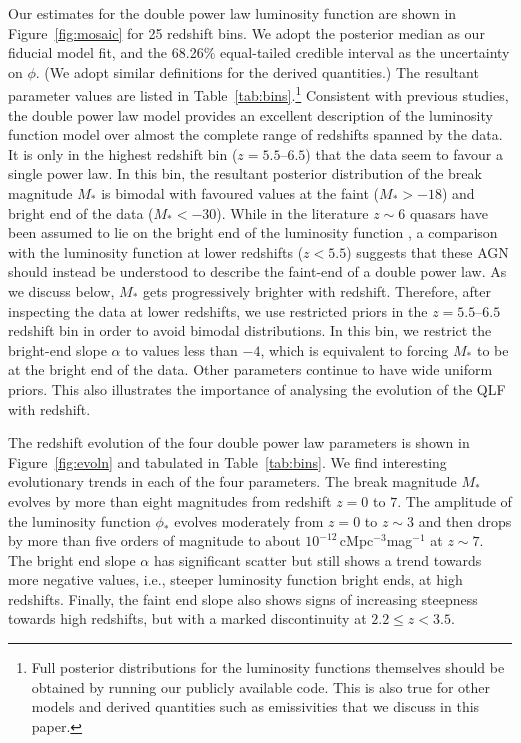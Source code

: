\documentclass[fleqn,usenatbib]{mnras}
\begin{document}
Our estimates for the double power law luminosity function are shown
in Figure~\ref{fig:mosaic} for 25 redshift bins.  We adopt the
posterior median as our fiducial model fit, and the 68.26\%
equal-tailed credible interval as the uncertainty on $\phi$.  (We
adopt similar definitions for the derived quantities.)  The resultant
parameter values are listed in Table~\ref{tab:bins}.\footnote{Full
  posterior distributions for the luminosity functions themselves
  should be obtained by running our publicly available code.  This is
  also true for other models and derived quantities such as
  emissivities that we discuss in this paper.} Consistent with
previous studies, the double power law model provides an excellent
description of the luminosity function model over almost the complete
range of redshifts spanned by the data.  It is only in the highest
redshift bin ($z=5.5$--$6.5$) that the data seem to favour a single
power law.  In this bin, the resultant posterior distribution of the
break magnitude $M_*$ is bimodal with favoured values at the faint
($M_*>-18$) and bright end of the data ($M_*<-30$).  While in the
literature $z\sim 6$ quasars have been assumed to lie on the bright
end of the luminosity function \citep[e.g.,][]{2016ApJ...833..222J}, a
comparison with the luminosity function at lower redshifts ($z<5.5$)
suggests that these AGN should instead be understood to describe the
faint-end of a double power law.  As we discuss below, $M_*$ gets
progressively brighter with redshift.  Therefore, after inspecting the
data at lower redshifts, we use restricted priors in the
$z=5.5$--$6.5$ redshift bin in order to avoid bimodal distributions.
In this bin, we restrict the bright-end slope $\alpha$ to values less
than $-4$, which is equivalent to forcing $M_*$ to be at the bright
end of the data.  Other parameters continue to have wide uniform
priors.  This also illustrates the importance of analysing the
evolution of the QLF with redshift.

The redshift evolution of the four double power law parameters is
shown in Figure~\ref{fig:evoln} and tabulated in Table~\ref{tab:bins}.
We find interesting evolutionary trends in each of the four
parameters.  The break magnitude $M_*$ evolves by more than eight
magnitudes from redshift $z=0$ to $7$.  The amplitude of the
luminosity function $\phi_*$ evolves moderately from $z=0$ to $z\sim
3$ and then drops by more than five orders of magnitude to about
$10^{-12}$\,cMpc$^{-3}$mag$^{-1}$ at $z\sim 7$.  The bright end slope
$\alpha$ has significant scatter but still shows a trend towards more
negative values, i.e., steeper luminosity function bright ends, at
high redshifts. Finally, the faint end slope also shows signs of
increasing steepness towards high redshifts, but with a marked
discontinuity at $2.2\le z<3.5$.
\end{document}

